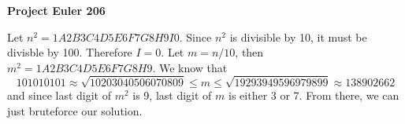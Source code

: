 \documentclass[a4paper,12pt]{article}
\begin{document}
\setlength\parindent{0pt}
\textbf{Project Euler 206}
\vspace{5ex}


Let \(n^2 = 1A2B3C4D5E6F7G8H9I0\). Since \(n^2\) is divisible by 10, it
must be divisble by 100. Therefore \(I = 0\). Let \(m = n/10\), then
\(m^2 = 1A2B3C4D5E6F7G8H9\). We know that
\[101010101 \approx \sqrt{10203040506070809} \leq m \leq
\sqrt{19293949596979899} \approx 138902662\]
and since last digit of \(m^2\) is 9, last digit of \(m\) is either 3 or 7.
From there, we can just bruteforce our solution.
\end{document}
